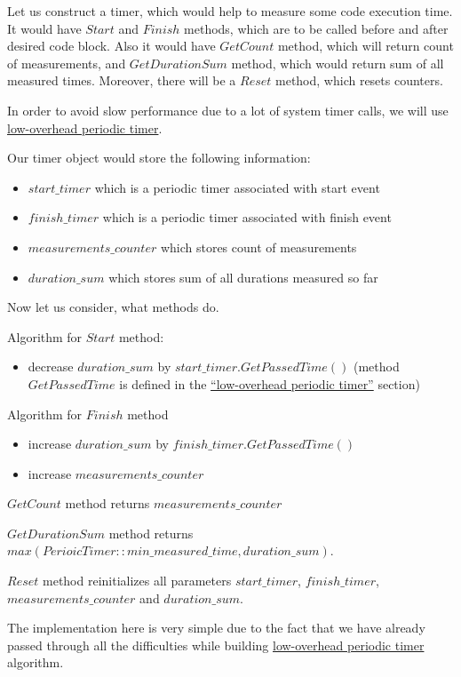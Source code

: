 \documentclass{article}
\begin{document}
Let us construct a timer, which would help to measure some code execution time. It would have $Start$ and $Finish$ methods, which are to be called before and after desired code block. Also it would have $GetCount$ method, which will return count of measurements, and $GetDurationSum$ method, which would return sum of all measured times. Moreover, there will be a $Reset$ method, which resets counters.

In order to avoid slow performance due to a lot of system timer calls, we will use \hyperref[subsec:low_overhead_periodic_timer]{low-overhead periodic timer}.

Our timer object would store the following information:
\begin{itemize}
	\item $start\_timer$ which is a periodic timer associated with start event
	\item $finish\_timer$ which is a periodic timer associated with finish event
	\item $measurements\_counter$ which stores count of measurements
	\item $duration\_sum$ which stores sum of all durations measured so far
\end{itemize}

Now let us consider, what methods do.

Algorithm for $Start$ method:
\begin{itemize}
	\item decrease $duration\_sum$ by $start\_timer.GetPassedTime()$ (method $GetPassedTime$ is defined in the \hyperref[subsec:low_overhead_periodic_timer]{``low-overhead periodic timer''} section)
\end{itemize}

Algorithm for $Finish$ method
\begin{itemize}
	\item increase $duration\_sum$ by $finish\_timer.GetPassedTime()$
	\item increase $measurements\_counter$
\end{itemize}

$GetCount$ method returns  $measurements\_counter$

$GetDurationSum$ method returns $max(PerioicTimer::min\_measured\_time, duration\_sum)$.

$Reset$ method reinitializes all parameters $start\_timer$, $finish\_timer$, $measurements\_counter$ and $duration\_sum$.

The implementation here is very simple due to the fact that we have already passed through all the difficulties while building \hyperref[subsec:low_overhead_periodic_timer]{low-overhead periodic timer} algorithm.
\end{document}
